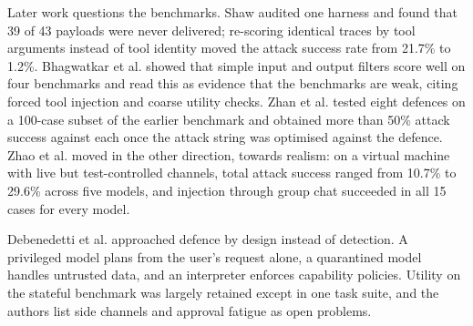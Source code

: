 Later work questions the benchmarks. Shaw \cite{r9} audited one harness and found that 39 of 43 payloads were never delivered; re-scoring identical traces by tool arguments instead of tool identity moved the attack success rate from 21.7\% to 1.2\%. Bhagwatkar et al. \cite{r10} showed that simple input and output filters score well on four benchmarks and read this as evidence that the benchmarks are weak, citing forced tool injection and coarse utility checks. Zhan et al. \cite{r21} tested eight defences on a 100-case subset of the earlier benchmark and obtained more than 50\% attack success against each once the attack string was optimised against the defence. Zhao et al. \cite{r22} moved in the other direction, towards realism: on a virtual machine with live but test-controlled channels, total attack success ranged from 10.7\% to 29.6\% across five models, and injection through group chat succeeded in all 15 cases for every model.

Debenedetti et al. \cite{r23} approached defence by design instead of detection. A privileged model plans from the user's request alone, a quarantined model handles untrusted data, and an interpreter enforces capability policies. Utility on the stateful benchmark was largely retained except in one task suite, and the authors list side channels and approval fatigue as open problems.

